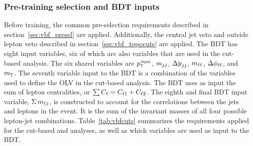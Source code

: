 \subsubsection{Pre-training selection and BDT inputs}
Before training, the common pre-selection requirements described in section~\ref{sec:vbf_presel} are applied. Additionally, the central jet veto and outside lepton veto described in section~\ref{sec:vbf_topocuts} are applied. The BDT has eight input variables, six of which are also variables that are used in the cut-based analysis. The six shared variables are $p_{\textrm{\footnotesize\sc t}}^{\,\rm sum}$, $m_{jj}$, $\dyjj$, $m_{\ell\ell}$, $\Delta\phi_{\ell\ell}$, and $m_{\textrm{\footnotesize\sc t}}$. The seventh variable input to the BDT is a combination of the variables used to define the OLV in the cut-based analysis. The BDT uses as input the sum of lepton centralities, or $\sum C_{\ell} = C_{\ell1} + C_{\ell2}$. The eighth and final BDT input variable, $\Sigma\,m_{\ell j}$, is constructed to account for the correlations between the jets and leptons in the event. It is the sum of the invariant masses of all four possible lepton-jet combinations. Table~\ref{tab:vbfcuts} summarizes the requirements applied for the cut-based and analyses, as well as which variables are used as input to the BDT.

